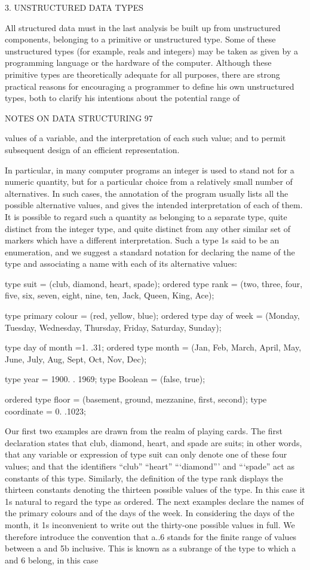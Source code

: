 3. UNSTRUCTURED DATA TYPES

All structured data must in the last analysis be built up from unstructured components, belonging to a primitive or unstructured type. Some of these unstructured types (for example, reals and integers) may be taken as given by a programming language or the hardware of the computer. Although these primitive types are theoretically adequate for all purposes, there are strong practical reasons for encouraging a programmer to define his own unstructured types, both to clarify his intentions about the potential range of

NOTES ON DATA STRUCTURING 97

values of a variable, and the interpretation of each such value; and to permit subsequent design of an efficient representation.

In particular, in many computer programs an integer is used to stand not for a numeric quantity, but for a particular choice from a relatively small number of alternatives. In such cases, the annotation of the program usually lists all the possible alternative values, and gives the intended interpretation of each of them. It is possible to regard such a quantity as belonging to a separate type, quite distinct from the integer type, and quite distinct from any other similar set of markers which have a different interpretation. Such a type 1s said to be an enumeration, and we suggest a standard notation for declaring the name of the type and associating a name with each of its alternative values:

type suit = (club, diamond, heart, spade); ordered type rank = (two, three, four, five, six, seven, eight, nine, ten, Jack, Queen, King, Ace);

type primary colour = (red, yellow, blue); ordered type day of week = (Monday, Tuesday, Wednesday, Thursday, Friday, Saturday, Sunday);

type day of month =1. .31; ordered type month = (Jan, Feb, March, April, May, June, July, Aug, Sept, Oct, Nov, Dec);

type year = 1900. . 1969; type Boolean = (false, true);

ordered type floor = (basement, ground, mezzanine, first, second); type coordinate = 0. .1023;

Our first two examples are drawn from the realm of playing cards. The first declaration states that club, diamond, heart, and spade are suits; in other words, that any variable or expression of type suit can only denote one of these four values; and that the identifiers “club” “heart” “‘diamond”’ and “‘spade” act as constants of this type. Similarly, the definition of the type rank displays the thirteen constants denoting the thirteen possible values of the type. In this case it 1s natural to regard the type as ordered. The next examples declare the names of the primary colours and of the days of the week. In considering the days of the month, it 1s inconvenient to write out the thirty-one possible values in full. We therefore introduce the convention that a..6 stands for the finite range of values between a and 5b inclusive. This is known as a subrange of the type to which a and 6 belong, in this case

